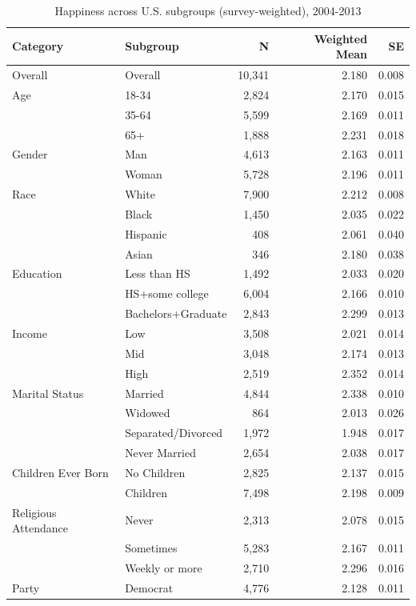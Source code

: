 \begin{table}[htbp]
\centering
\caption{Happiness across U.S. subgroups (survey-weighted), 2004-2013}
\begin{tabular}{llrrr}
\toprule
Category & Subgroup & N & Weighted Mean & SE \\
\midrule
Overall & Overall & 10,341 & 2.180 & 0.008 \\
\midrule
Age & 18-34 & 2,824 & 2.170 & 0.015 \\
 & 35-64 & 5,599 & 2.169 & 0.011 \\
 & 65+ & 1,888 & 2.231 & 0.018 \\
\midrule
Gender & Man & 4,613 & 2.163 & 0.011 \\
 & Woman & 5,728 & 2.196 & 0.011 \\
\midrule
Race & White & 7,900 & 2.212 & 0.008 \\
 & Black & 1,450 & 2.035 & 0.022 \\
 & Hispanic & 408 & 2.061 & 0.040 \\
 & Asian & 346 & 2.180 & 0.038 \\
\midrule
Education & Less than HS & 1,492 & 2.033 & 0.020 \\
 & HS+some college & 6,004 & 2.166 & 0.010 \\
 & Bachelors+Graduate & 2,843 & 2.299 & 0.013 \\
\midrule
Income & Low & 3,508 & 2.021 & 0.014 \\
 & Mid & 3,048 & 2.174 & 0.013 \\
 & High & 2,519 & 2.352 & 0.014 \\
\midrule
Marital Status & Married & 4,844 & 2.338 & 0.010 \\
 & Widowed & 864 & 2.013 & 0.026 \\
 & Separated/Divorced & 1,972 & 1.948 & 0.017 \\
 & Never Married & 2,654 & 2.038 & 0.017 \\
\midrule
Children Ever Born & No Children & 2,825 & 2.137 & 0.015 \\
 & Children & 7,498 & 2.198 & 0.009 \\
\midrule
Religious Attendance & Never & 2,313 & 2.078 & 0.015 \\
 & Sometimes & 5,283 & 2.167 & 0.011 \\
 & Weekly or more & 2,710 & 2.296 & 0.016 \\
\midrule
Party & Democrat & 4,776 & 2.128 & 0.011 \\

\end{tabular}
\end{table}
